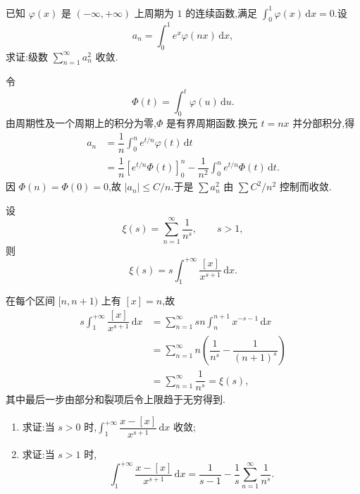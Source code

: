 \begin{example}
    已知 $\varphi(x)$ 是 $(-\infty,+\infty)$ 上周期为 $1$ 的连续函数,满足 $\displaystyle\int_0^1\varphi(x)\,\mathrm{d}x=0$.设
    \[
        a_n=\int_0^1e^x\varphi(nx)\,\mathrm{d}x,
    \]
    求证:级数 $\displaystyle\sum\limits_{n=1}^{\infty}a_n^2$ 收敛.
\end{example}
\exampleblank

\begin{solution}
    令
    \[
        \Phi(t)=\int_0^t\varphi(u)\,\mathrm{d}u.
    \]
    由周期性及一个周期上的积分为零,$\Phi$ 是有界周期函数.换元 $t=nx$ 并分部积分,得
    \[
        \begin{aligned}
            a_n & =\dfrac{1}{n}\int_0^ne^{t/n}\varphi(t)\,\mathrm{d}t \\
                & =\dfrac{1}{n}\left[e^{t/n}\Phi(t)\right]_0^n
            -\dfrac{1}{n^2}\int_0^ne^{t/n}\Phi(t)\,\mathrm{d}t.
        \end{aligned}
    \]
    因 $\Phi(n)=\Phi(0)=0$,故 $|a_n|\leq C/n$.于是
    $\displaystyle \sum a_n^2$ 由 $\displaystyle \sum C^2/n^2$ 控制而收敛.
\end{solution}

\begin{example}[\markstar]
    设
    \[
        \xi(s)=\sum\limits_{n=1}^{\infty}\dfrac{1}{n^s},
        \qquad s>1,
    \]
    则
    \[
        \xi(s)=s\int_1^{+\infty}\dfrac{[x]}{x^{s+1}}\,\mathrm{d}x.
    \]
\end{example}
\exampleblank

\begin{solution}
    在每个区间 $[n,n+1)$ 上有 $[x]=n$,故
    \[
        \begin{aligned}
            s\int_1^{+\infty}\dfrac{[x]}{x^{s+1}}\,\mathrm{d}x
             & =\sum\limits_{n=1}^{\infty}sn\int_n^{n+1}x^{-s-1}\,\mathrm{d}x             \\
             & =\sum\limits_{n=1}^{\infty}n\left(\dfrac{1}{n^s}-\dfrac{1}{(n+1)^s}\right) \\
             & =\sum\limits_{n=1}^{\infty}\dfrac{1}{n^s}=\xi(s),
        \end{aligned}
    \]
    其中最后一步由部分和裂项后令上限趋于无穷得到.
\end{solution}

\begin{example}[\markstar]
    \begin{enumerate}
        \item 求证:当 $s>0$ 时,$\displaystyle\int_1^{+\infty}\dfrac{x-[x]}{x^{s+1}}\,\mathrm{d}x$ 收敛;
        \item 求证:当 $s>1$ 时,
              \[
                  \displaystyle\int_1^{+\infty}\dfrac{x-[x]}{x^{s+1}}\,\mathrm{d}x
                  =\dfrac{1}{s-1}-\dfrac{1}{s}\sum\limits_{n=1}^{\infty}\dfrac{1}{n^s}.
              \]
    \end{enumerate}
\end{example}
\exampleblank

